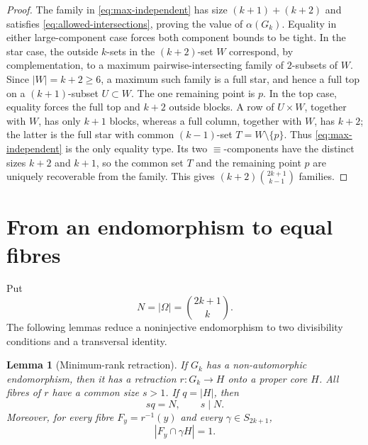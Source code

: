 \documentclass[11pt]{article}
\theoremstyle{plain}
\newtheorem{lemma}[theorem]{Lemma}
\theoremstyle{remark}
\begin{document}
\begin{proof}
The family in \eqref{eq:max-independent} has size $(k+1)+(k+2)$ and
satisfies \eqref{eq:allowed-intersections}, proving the value of
$\alpha(G_k)$.  Equality in either large-component case forces both
component bounds to be tight.  In the star case, the outside $k$-sets in
the $(k+2)$-set $W$ correspond, by complementation, to a maximum
pairwise-intersecting family of $2$-subsets of $W$.  Since $|W|=k+2\ge6$,
a maximum such family is a full star, and
hence a full top on a $(k+1)$-subset $U\subset W$.  The one remaining
point is $p$.  In the top case, equality forces the full top and $k+2$
outside blocks.  A row of $U\times W$, together with $W$, has only $k+1$
blocks, whereas a full column, together with $W$, has $k+2$; the latter is
the full star with common $(k-1)$-set $T=W\setminus\{p\}$.  Thus
\eqref{eq:max-independent} is the only equality type.  Its two
$\equiv$-components have the distinct sizes $k+2$ and $k+1$, so the common
set $T$ and the remaining point $p$ are uniquely recoverable from the
family.  This gives $(k+2)\binom{2k+1}{k-1}$ families.
\end{proof}

\section{From an endomorphism to equal fibres}\label{sec:reduction}

Put
\[
 N=|\Omega|=\binom{2k+1}{k}.
\]
The following lemmas reduce a noninjective endomorphism to two divisibility
conditions and a transversal identity.

\begin{lemma}[Minimum-rank retraction]\label{lem:retraction}
If $G_k$ has a non-automorphic endomorphism, then it has a retraction
$r:G_k\to H$ onto a proper core $H$.  All fibres of $r$ have a common size
$s>1$.  If $q=|H|$, then
\begin{equation}\label{eq:sqN}
 sq=N,\qquad s\mid N.
\end{equation}
Moreover, for every fibre $F_y=r^{-1}(y)$ and every
$\gamma\in S_{2k+1}$,
\begin{equation}\label{eq:transversal}
 |F_y\cap\gamma H|=1.
\end{equation}
\end{lemma}
\end{document}
